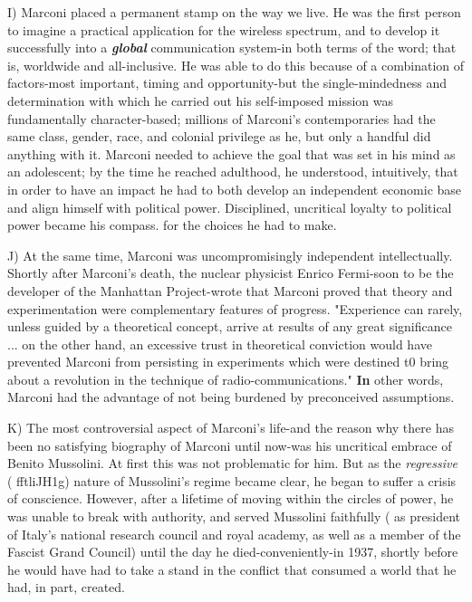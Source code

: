 \documentclass[UTF8,11pt]{ctexart}
\begin{document}
I) Marconi placed a permanent stamp on the way we live. He was the first person to imagine a practical application for the wireless spectrum, and to develop it successfully into a \textbf{\textit{global }}communication system-in both terms of the word; that is, worldwide and all-inclusive. He was able to do this because of a combination of factors-most important, timing and opportunity-but the single-mindedness and determination with which he carried out his self-imposed mission was fundamentally character-based; millions of Marconi's contemporaries had the same class, gender, race, and colonial privilege as he, but only a handful did anything with it. Marconi needed to achieve the goal that was set in his mind as an adolescent; by the time he reached adulthood, he understood, intuitively, that in order to have an impact he had to both develop an independent economic base and align himself with political power. Disciplined, uncritical loyalty to political power became his compass. for the choices he had to make.


J) At the same time, Marconi was uncompromisingly independent intellectually. Shortly after Marconi's death, the nuclear physicist Enrico Fermi-soon to be the developer of the Manhattan Project-wrote that Marconi proved that theory and experimentation were complementary features of progress. "Experience can rarely, unless guided by a theoretical concept, arrive at results of any great significance ... on the other hand, an excessive \textperiodcentered{}trust in theoretical conviction would have prevented Marconi from persisting in experiments which were destined t0 bring about a revolution in the technique of radio-communications." \textbf{In }other words, Marconi had the advantage of not being burdened by preconceived assumptions.


K) The most controversial aspect of Marconi's life-and the reason why there has been no satisfying biography of Marconi until now-was his uncritical embrace of Benito Mussolini. At first this was not problematic for him. But as the \textit{regressive }( fftliJH1g) nature of Mussolini's \textperiodcentered{}regime became clear, he began to suffer a crisis of conscience. However, after a lifetime of moving within the circles of power, he was unable to break with authority, and served Mussolini faithfully ( as president of Italy's national research council and royal academy, as well as a member of the Fascist Grand Council) until the day he died-conveniently-in 1937, shortly before he would have had to take a stand in the conflict that consumed a world that he had, in part, created.
\end{document}
